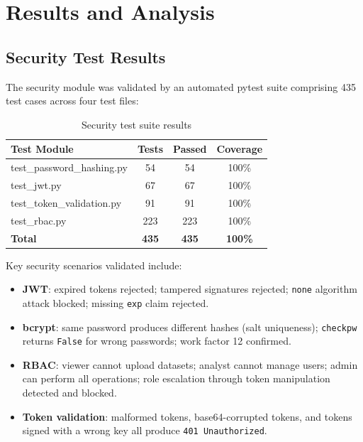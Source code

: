 \documentclass[12pt,a4paper]{report}
\begin{document}
\chapter{Results and Analysis}

\section{Security Test Results}

The security module was validated by an automated pytest suite comprising 435 test cases across four test files:

\begin{table}[H]
\centering
\caption{Security test suite results}
\begin{tabularx}{\textwidth}{Xccc}
\toprule
\textbf{Test Module} & \textbf{Tests} & \textbf{Passed} & \textbf{Coverage} \\
\midrule
test\_password\_hashing.py & 54  & 54  & 100\% \\
test\_jwt.py               & 67  & 67  & 100\% \\
test\_token\_validation.py & 91  & 91  & 100\% \\
test\_rbac.py              & 223 & 223 & 100\% \\
\midrule
\textbf{Total}             & \textbf{435} & \textbf{435} & \textbf{100\%} \\
\bottomrule
\end{tabularx}
\label{tab:security_tests}
\end{table}

Key security scenarios validated include:

\begin{itemize}[leftmargin=2em]
    \item \textbf{JWT}: expired tokens rejected; tampered signatures rejected; \texttt{none} algorithm attack blocked; missing \texttt{exp} claim rejected.
    \item \textbf{bcrypt}: same password produces different hashes (salt uniqueness); \texttt{checkpw} returns \texttt{False} for wrong passwords; work factor 12 confirmed.
    \item \textbf{RBAC}: viewer cannot upload datasets; analyst cannot manage users; admin can perform all operations; role escalation through token manipulation detected and blocked.
    \item \textbf{Token validation}: malformed tokens, base64-corrupted tokens, and tokens signed with a wrong key all produce \texttt{401 Unauthorized}.
\end{itemize}
\end{document}
